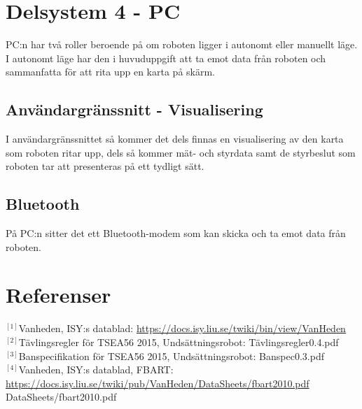 \documentclass[11pt]{article}
\begin{document}
\begin{flushleft}
\section{Delsystem 4 - PC}
PC:n har två roller  beroende på om roboten ligger i autonomt eller manuellt läge. I autonomt läge har den i huvuduppgift att ta emot data från roboten och sammanfatta för att rita upp en karta på skärm.

\subsection{Användargränssnitt - Visualisering}
I användargränssnittet så kommer det dels finnas en visualisering av den karta som roboten ritar upp, dels så kommer mät- och styrdata samt de styrbeslut som roboten tar att presenteras på ett tydligt sätt.

\subsection{Bluetooth}
På PC:n sitter det ett Bluetooth-modem som kan skicka och ta emot data från roboten.  


\setcounter{secnumdepth}{0}
\pagebreak
\section{Referenser}


$^{[1]}$Vanheden, ISY:s datablad: \url{https://docs.isy.liu.se/twiki/bin/view/VanHeden} \\[0.1in]

$^{[2]}$Tävlingsregler för TSEA56 2015, Undsättningsrobot: Tävlingsregler0.4.pdf \\[0.1in]

$^{[3]}$Banspecifikation för TSEA56 2015, Undsättningsrobot: Banspec0.3.pdf \\[0.1in]

$^{[4]}$Vanheden, ISY:s datablad, FBART: \url{https://docs.isy.liu.se/twiki/pub/VanHeden/DataSheets/fbart2010.pdf} \\[0.1in]
DataSheets/fbart2010.pdf

\setcounter{secnumdepth}{2}



\end{flushleft}
\end{document}
